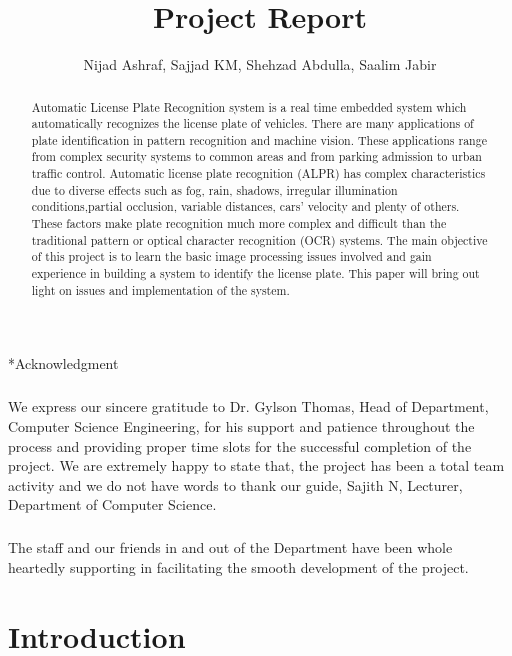 \documentclass[a4paper,10pt]{iesreport}
\title{\strong{\textbf{Automatic License Plate Recognition}} \linebreak Project Report}
\author{Nijad Ashraf, Sajjad KM, Shehzad Abdulla, Saalim Jabir}
\begin{document}
\maketitle


\begin{section}*{Acknowledgment}
\paragraph*{}
We express our sincere gratitude to Dr. Gylson Thomas, Head of Department, Computer Science Engineering, for his support and patience throughout the process and providing proper time slots for  the successful completion of the project. We are extremely happy to state that, the project has been a total team activity and we do not have words to thank our guide, Sajith N, Lecturer, Department of Computer Science. 
\paragraph*{}
The staff and our friends in and out of the Department have been whole heartedly supporting in facilitating the smooth development of the project.
\end{section}

\tableofcontents
\listoftables
\listoffigures

\begin{abstract}
Automatic License Plate Recognition system is a real time embedded system which automatically recognizes the license plate of vehicles. There are many applications of plate identification in pattern recognition and machine vision. These applications range from complex security systems to common areas and from parking admission
to urban traffic control. Automatic license plate recognition (ALPR)
has complex characteristics due to diverse effects such as fog, rain,
shadows, irregular illumination conditions,partial occlusion, variable
distances, cars’ velocity and plenty of others. These
factors make plate recognition much more complex and difficult than
the traditional pattern or optical character recognition (OCR) systems. The main objective of this project is to learn the basic image
processing issues involved and gain experience in building a system
to identify the license plate. This paper will bring out light on issues and implementation of the system.
\end{abstract}
\chapter[Introduction]{Introduction}
\end{document}
